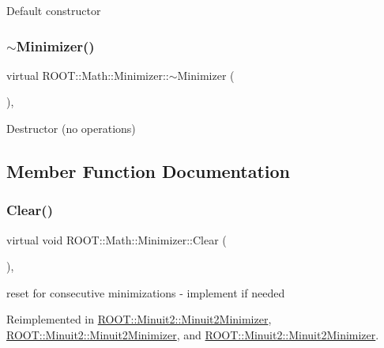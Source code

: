 Default constructor \mbox{\label{classROOT_1_1Math_1_1Minimizer_aa1045455fe657956659bfa7a21ce447e}} 
\subsubsection{\texorpdfstring{$\sim$Minimizer()}{~Minimizer()}\hspace{0.1cm}{\footnotesize\ttfamily [3/3]}}
{\footnotesize\ttfamily virtual R\+O\+O\+T\+::\+Math\+::\+Minimizer\+::$\sim$\+Minimizer (\begin{DoxyParamCaption}{ }\end{DoxyParamCaption})\hspace{0.3cm}{\ttfamily [inline]}, {\ttfamily [virtual]}}

Destructor (no operations) 

\subsection{Member Function Documentation}
\mbox{\label{classROOT_1_1Math_1_1Minimizer_ad7308846baecf68fb0dbc2d5e4caa178}} 
\subsubsection{\texorpdfstring{Clear()}{Clear()}\hspace{0.1cm}{\footnotesize\ttfamily [1/3]}}
{\footnotesize\ttfamily virtual void R\+O\+O\+T\+::\+Math\+::\+Minimizer\+::\+Clear (\begin{DoxyParamCaption}{ }\end{DoxyParamCaption})\hspace{0.3cm}{\ttfamily [inline]}, {\ttfamily [virtual]}}



reset for consecutive minimizations -\/ implement if needed 



Reimplemented in \mbox{\hyperlink{classROOT_1_1Minuit2_1_1Minuit2Minimizer_a11e6ce9a4285080548f9855b78ca83b4}{R\+O\+O\+T\+::\+Minuit2\+::\+Minuit2\+Minimizer}}, \mbox{\hyperlink{classROOT_1_1Minuit2_1_1Minuit2Minimizer_a11e6ce9a4285080548f9855b78ca83b4}{R\+O\+O\+T\+::\+Minuit2\+::\+Minuit2\+Minimizer}}, and \mbox{\hyperlink{classROOT_1_1Minuit2_1_1Minuit2Minimizer_a11e6ce9a4285080548f9855b78ca83b4}{R\+O\+O\+T\+::\+Minuit2\+::\+Minuit2\+Minimizer}}.

